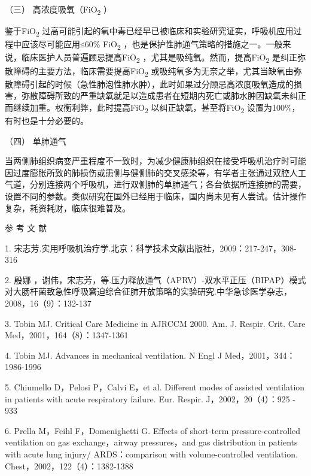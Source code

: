 \hypertarget{text00371.htmlux5cux23CHP16-3-5-5-3}{}
（三） 高浓度吸氧（FiO\textsubscript{2} ）

鉴于FiO\textsubscript{2}
过高可能引起的氧中毒已经早已被临床和实验研究证实，呼吸机应用过程中应该尽可能应用≤60\%
FiO\textsubscript{2}
，也是保护性肺通气策略的措施之一。一般来说，临床医护人员普遍顾忌提高FiO\textsubscript{2}
，尤其是吸纯氧。然而，提高FiO\textsubscript{2}
是纠正弥散障碍的主要方法，临床需要提高FiO\textsubscript{2}
或吸纯氧多为无奈之举，尤其当缺氧由弥散障碍引起的时候（急性肺泡性肺水肿），此时如果过分顾忌高浓度吸氧造成的损害，弥散障碍所致的严重缺氧就足以造成患者在短期内死亡或肺水肿因缺氧未纠正而继续加重。权衡利弊，此时提高FiO\textsubscript{2}
以纠正缺氧，甚至将FiO\textsubscript{2} 设置为100\%，有时也是十分必要的。

\hypertarget{text00371.htmlux5cux23CHP16-3-5-5-4}{}
（四） 单肺通气

当两侧肺组织病变严重程度不一致时，为减少健康肺组织在接受呼吸机治疗时可能因过度膨胀所致的肺损伤或患侧与健侧肺的交叉感染等，有学者主张通过双腔人工气道，分别连接两个呼吸机，进行双侧肺的单肺通气；各台依据所连接肺的需要，设置不同的参数。类似研究在国外已经用于临床，国内尚未见有人尝试。估计操作复杂，耗资耗财，临床很难普及。

\protect\hypertarget{text00372.html}{}{}

\hypertarget{text00372.htmlux5cux23CHP16-3-6}{}
参 考 文 献

1.
宋志芳.实用呼吸机治疗学.北京：科学技术文献出版社，2009：217-247，308-316

2. 殷娜
，谢伟，宋志芳，等.压力释放通气（APRV）-双水平正压（BIPAP）模式对大肠杆菌致急性呼吸窘迫综合征肺开放策略的实验研究.中华急诊医学杂志，2008，16（9）：132-137

3. Tobin MJ. Critical Care Medicine in AJRCCM 2000. Am. J. Respir. Crit.
Care Med，2001，164（8）：1347-1361

4. Tobin MJ. Advances in mechanical ventilation. N Engl J
Med，2001，344：1986-1996

5. Chiumello D，Pelosi P，Calvi E，et al. Different modes of assisted
ventilation in patients with acute respiratory failure. Eur. Respir.
J，2002，20（4）：925 - 933

6. Prella M，Feihl F，Domenighetti G. Effects of short-term
pressure-controlled ventilation on gas exchange，airway pressures，and
gas distribution in patients with acute lung injury/ ARDS：comparison
with volume-controlled ventilation. Chest，2002，122（4）：1382-1388

\protect\hypertarget{text00373.html}{}{}

